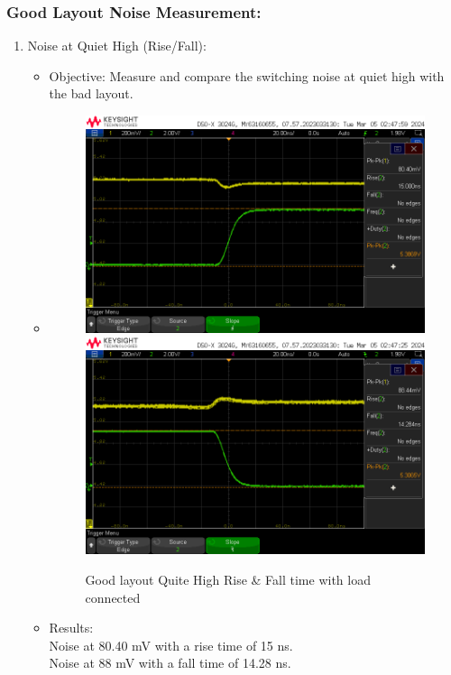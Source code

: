 \documentclass[a4paper,11pt]{article}%
\begin{document}
\begin{enumerate}
\end{enumerate}

\subsubsection{Good Layout Noise Measurement:}

\begin{enumerate}
	\item Noise at Quiet High (Rise/Fall):
	\begin{itemize}
		\item Objective: Measure and compare the switching noise at quiet high with the bad layout.
		\item 
		\begin{figure}[H]
			\centering
			\includegraphics[scale=0.6]{figures/good/quite_high/rise/rising_qh_good7.png}
			\includegraphics[scale=0.6]{figures/good/quite_high/fall/falling_qh_good6.png}
			\caption{Good layout Quite High Rise \& Fall time with load connected}
		\end{figure}
		\item Results:\\
		Noise at 80.40 mV with a rise time of 15 ns.\\
		Noise at 88 mV with a fall time of 14.28 ns.
	\end{itemize}
	

\end{enumerate}
\end{document}
